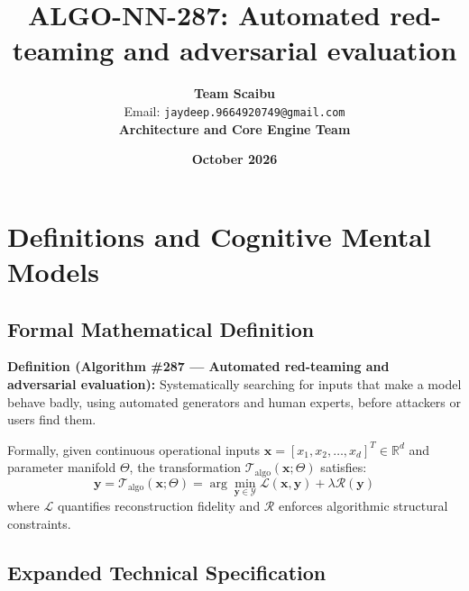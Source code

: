 \documentclass[11pt,a4paper]{article}
\title{\textbf{ALGO-NN-287: Automated red-teaming and adversarial evaluation}}
\author{\textbf{Team Scaibu} \\ \small Email: \texttt{jaydeep.9664920749@gmail.com} \\ \small \textbf{Architecture and Core Engine Team}}
\date{\textbf{October 2026}}
\theoremstyle{definition}
\begin{document}
\maketitle

\section{Definitions and Cognitive Mental Models}

\subsection{Formal Mathematical Definition}
\textbf{Definition (Algorithm \#287 --- Automated red-teaming and adversarial evaluation):}
Systematically searching for inputs that make a model behave badly, using automated generators and human experts, before attackers or users find them.

Formally, given continuous operational inputs $\mathbf{x} = [x_1, x_2, \dots, x_d]^T \in \mathbb{R}^d$ and parameter manifold $\Theta$, the transformation $\mathcal{T}_{\text{algo}}(\mathbf{x}; \Theta)$ satisfies:
{\boldmath
\begin{equation}
\mathbf{y} = \mathcal{T}_{\text{algo}}(\mathbf{x}; \Theta) = \arg\min_{\mathbf{y} \in \mathcal{Y}} \mathcal{L}(\mathbf{x}, \mathbf{y}) + \lambda \mathcal{R}(\mathbf{y})
\end{equation}
}
where $\mathcal{L}$ quantifies reconstruction fidelity and $\mathcal{R}$ enforces algorithmic structural constraints.

\subsection{Expanded Technical Specification}
\end{document}
